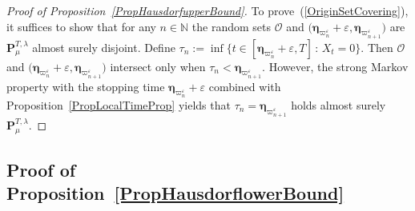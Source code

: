 \documentclass[10pt]{article}
\numberwithin{equation}{section}
\theoremstyle{definition}
\begin{document}
\begin{proof}[Proof of Proposition~\ref{PropHausdorfupperBound}]
To prove~(\ref{OriginSetCovering}), it suffices to show that for any $n\in \mathbb{N}$    the random sets $\mathscr{O}$ and $\big(\boldsymbol{\eta}_{\varpi_{n}^{\varepsilon}} +\varepsilon    , \boldsymbol{\eta}_{\varpi_{n+1}^{\varepsilon}} \big)  $  are $\mathbf{P}_{\mu}^{T,\lambda}$ almost surely  disjoint.  Define $\tau_{n}:=\inf\big\{t\in [\boldsymbol{\eta}_{\varpi_{n}^{\varepsilon}}+\varepsilon ,T]\,:\,X_t=0   \big\}  $. Then  $\mathscr{O}$ and $\big( \boldsymbol{\eta}_{\varpi_{n}^{\varepsilon}} +\varepsilon    , \boldsymbol{\eta}_{\varpi_{n+1}^{\varepsilon}} \big)  $ intersect  only when $\tau_{n} < \boldsymbol{\eta}_{\varpi_{n+1}^{\varepsilon}} $.   However, the  strong Markov property with the stopping time $\boldsymbol{\eta}_{\varpi_{n}^{\varepsilon}} +\varepsilon$ combined with  Proposition~\ref{PropLocalTimeProp} yields that $\tau_n= \boldsymbol{\eta}_{\varpi_{n+1}^{\varepsilon}} $ holds  almost surely $\mathbf{P}_{\mu}^{T,\lambda}$.
\end{proof}






\subsection{Proof of Proposition~\ref{PropHausdorflowerBound}}
\end{document}
